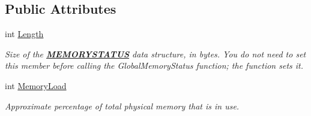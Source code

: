\subsection*{Public Attributes}
\begin{DoxyCompactItemize}
\item 
int \hyperlink{struct_tao_1_1_platform_1_1_windows_1_1_kernel_1_1_m_e_m_o_r_y_s_t_a_t_u_s_a3aa617a35bd296e6bfb7315625ca2c2e}{Length}
\begin{DoxyCompactList}\small\item\em Size of the {\bfseries \hyperlink{struct_tao_1_1_platform_1_1_windows_1_1_kernel_1_1_m_e_m_o_r_y_s_t_a_t_u_s}{MEMORYSTATUS}} data structure, in bytes. You do not need to set this member before calling the GlobalMemoryStatus function; the function sets it. \item\end{DoxyCompactList}\item 
int \hyperlink{struct_tao_1_1_platform_1_1_windows_1_1_kernel_1_1_m_e_m_o_r_y_s_t_a_t_u_s_a11e7d82ba85b8c714713591f3146efac}{MemoryLoad}
\begin{DoxyCompactList}\small\item\em Approximate percentage of total physical memory that is in use. 


\end{DoxyCompactList}
\end{DoxyCompactItemize}
